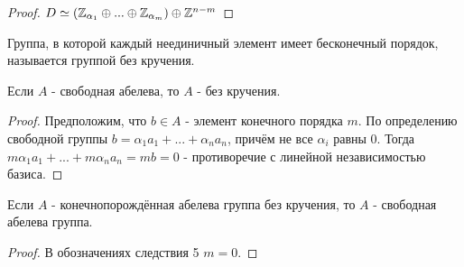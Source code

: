\begin{proof}
    $D \simeq (\mathbb{Z}_{\alpha_1} \oplus ... \oplus \mathbb{Z}_{\alpha_m}) \oplus \mathbb{Z}^{n-m}$
\end{proof}
\begin{definition}
    Группа, в которой каждый неединичный элемент имеет бесконечный порядок, называется группой без кручения.
\end{definition}
\begin{exercise}
    Если $A$ - свободная абелева, то $A$ - без кручения.
\end{exercise}
\begin{proof}
    Предположим, что $b \in A$ - элемент конечного порядка $m$. По определению свободной группы $b = \alpha_1a_1 + ... + \alpha_na_n$, причём не все $\alpha_i$ равны 0. Тогда $m\alpha_1a_1 + ... + m\alpha_na_n = mb = 0$ - противоречие с линейной независимостью базиса.
\end{proof}
\begin{consequensenum}
    Если $A$ - конечнопорождённая абелева группа без кручения, то $A$ - свободная абелева группа.
\end{consequensenum}
\begin{proof}
    В обозначениях следствия 5 $m = 0$.
\end{proof}
